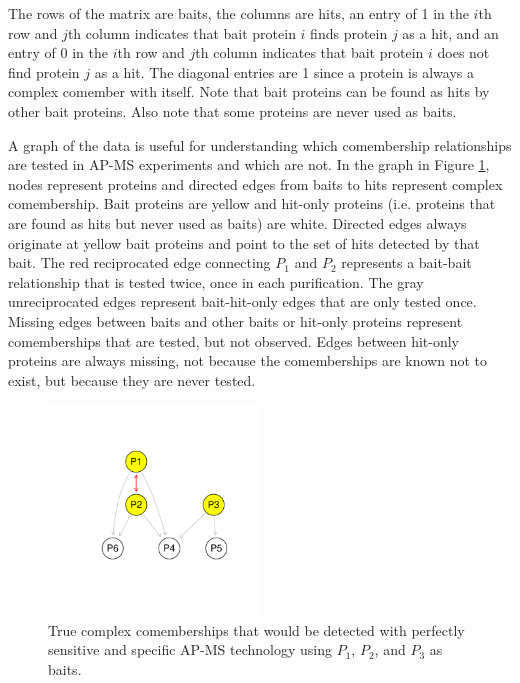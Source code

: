 \documentclass[11pt]{article}
\begin{document}
\vspace{.2in}

\noindent The rows of the matrix are baits, the columns are hits, an
entry of 1 in the $i$th row and $j$th column indicates that bait protein $i$
finds protein $j$ as a hit, and an entry of 0 in the $i$th row and $j$th
column indicates that bait protein $i$ does not find protein $j$ as a hit.
 The diagonal entries are 1 since a protein is always a complex comember with itself.  Note that bait proteins can be found as hits by other bait
proteins.  Also note that some proteins are never used as baits.  

A graph of the data is useful for understanding which comembership relationships are
tested in AP-MS experiments and which are not.  In the graph in Figure \ref{fig:trueData}, nodes
represent proteins and directed edges from baits to hits represent complex
comembership.  Bait proteins are yellow and hit-only proteins
(i.e. proteins that are found as hits but never used as baits) are white.
Directed edges always originate at yellow bait proteins and point to the set
of hits detected by that bait.  The
red reciprocated edge connecting $P_{1}$ and $P_{2}$ represents a bait-bait relationship that is tested
twice, once in each purification.  The gray unreciprocated edges represent bait-hit-only edges that are
only tested once.  Missing edges between baits and other baits or hit-only
proteins represent comemberships that are tested, but not observed.  Edges
between hit-only proteins are always missing, not because the comemberships
are known not to exist, but because they are never tested.


\begin{figure}[htbp]
\begin{center}
\includegraphics[width=0.5\textwidth]{apComplex-trueData}
\caption{\label{fig:trueData} True complex comemberships that would be
detected with perfectly sensitive and specific AP-MS technology using $P_{1}$,
$P_{2}$, and $P_{3}$ as baits.}
\end{center}
\end{figure}
\end{document}
